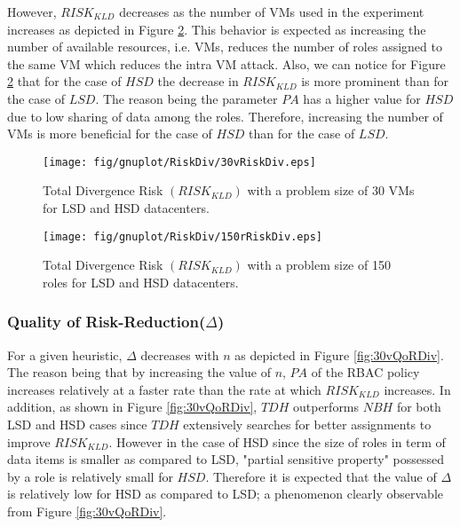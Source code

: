 However, $RISK_{KLD}$  decreases as the number of VMs used in the experiment increases as depicted in Figure \ref{fig:150rRiskDiv}. This behavior is expected as increasing the number of available resources, i.e. VMs, reduces the number of roles assigned to the same VM which reduces the intra VM attack. Also, we can notice for Figure \ref{fig:150rRiskDiv} that for the case of $HSD$ the decrease in $RISK_{KLD}$ is more  prominent than for the case of $LSD$. The reason being the parameter $PA$ has a higher value for $HSD$ due to low sharing of data among the roles. Therefore, increasing the number of VMs is more beneficial for the case of $HSD$ than for  the case of $LSD$.


 \begin{figure}[t!]
    \begin{center}
        \texttt{[image: fig/gnuplot/RiskDiv/30vRiskDiv.eps]}
        \caption{Total Divergence Risk $(RISK_{KLD})$ with a problem size of 30 VMs  for LSD and HSD datacenters.} 
        \label{fig:30vRiskDiv}     
             \end{center}          
                \vspace{-1.0em}
\end{figure} 

\begin{figure}[t!]
    \begin{center}
        \texttt{[image: fig/gnuplot/RiskDiv/150rRiskDiv.eps]}
        \caption{Total Divergence Risk $(RISK_{KLD})$ with a problem size of 150 roles for LSD and HSD datacenters.} 
        \label{fig:150rRiskDiv}
     \end{center}         
             \vspace{-1.0em}
\end{figure} 




\subsubsection{Quality of Risk-Reduction($\Delta$)}
For a given heuristic, $\Delta$  decreases with $n$ as depicted in Figure \ref{fig:30vQoRDiv}. The reason being that by increasing the value of $n$, $PA$ of the RBAC policy increases relatively at a faster rate than the rate at which  $RISK_{KLD}$ increases. In addition, as shown in Figure \ref{fig:30vQoRDiv}, $TDH$  outperforms  $NBH$ for both LSD and HSD cases since  $TDH$ extensively searches for better assignments to improve  $RISK_{KLD}$. However in the case of HSD since the size of roles in term of  data items is smaller as compared to LSD, "partial sensitive property" possessed by a role is relatively small for $HSD$.  Therefore it is expected that the value of $\Delta$ is relatively low for HSD as compared to LSD; a phenomenon clearly observable from Figure \ref{fig:30vQoRDiv}. 


